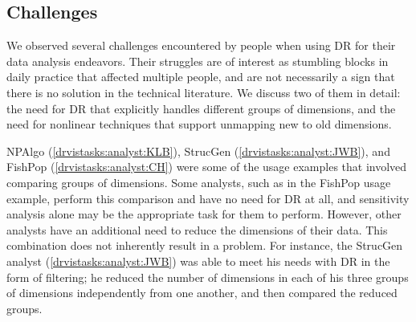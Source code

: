 
\subsection{Challenges}
\label{app:drvistasks:dritw:challenges}


We observed several challenges encountered by people when using \ac{DR} for their data analysis endeavors. 
Their struggles are of interest as stumbling blocks in daily practice that affected multiple people, and are not necessarily a sign that there is no solution in the technical literature. 
We discuss two of them in detail: the need for \ac{DR} that explicitly handles different groups of dimensions, and the need for nonlinear techniques that support unmapping new to old dimensions. 

{\sc NPAlgo} (\ref{drvistasks:analyst:KLB}), {\sc StrucGen} (\ref{drvistasks:analyst:JWB}), and {\sc FishPop} (\ref{drvistasks:analyst:CH}) were some of the usage examples that involved comparing  groups of dimensions. 
Some analysts, such as in the {\sc FishPop} usage example, perform this comparison and have no need for \ac{DR} at all, and sensitivity analysis alone may be the appropriate task for them to perform. 
However, other analysts have an additional need to reduce the dimensions of their data. 
This combination does not inherently result in a problem. 
For instance, the {\sc StrucGen} analyst (\ref{drvistasks:analyst:JWB}) was able to meet his needs with \ac{DR} in the form of filtering; he reduced the number of dimensions in each of his three groups of dimensions independently from one another, and then compared the reduced groups. 

